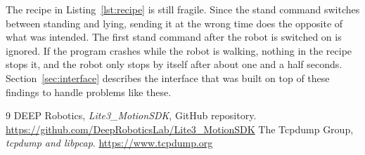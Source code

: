 The recipe in Listing~\ref{lst:recipe} is still fragile. Since the stand command switches between standing
and lying, sending it at the wrong time does the opposite of what was intended. The first stand command
after the robot is switched on is ignored. If the program crashes while the robot is walking,
nothing in the recipe stops it, and the robot only stops by itself after about one and a half seconds. Section~\ref{sec:interface} describes the interface that was built on top of these
findings to handle problems like these.

\begin{thebibliography}{9}
 DEEP Robotics, \emph{Lite3\_MotionSDK}, GitHub repository.
  \url{https://github.com/DeepRoboticsLab/Lite3_MotionSDK}
 The Tcpdump Group, \emph{tcpdump and libpcap}. \url{https://www.tcpdump.org}
\end{thebibliography}


